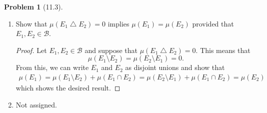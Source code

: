 \documentclass[12pt]{article}
\newcommand{\B}{\mathcal{B}}
\theoremstyle{definition}
\newtheorem{problem}{Problem}
\begin{document}
\begin{problem}[11.3]

    \begin{enumerate}[label = (\alph{*})]
        \item Show that \( \mu(E_1 \bigtriangleup E_2) = 0 \) implies \( \mu(E_1) = \mu(E_2) \) provided that \( E_1, E_2 \in \B  \). 
            \begin{proof}
                Let \( E_1, E_2 \in \B \) and suppose that \( \mu(E_1 \bigtriangleup E_2) = 0 \). This means that
                    \[
                        \mu(E_1 \setminus E_2) = \mu(E_2 \setminus E_1) = 0.
                    \]
                From this, we can write \( E_1 \) and \( E_2 \) as disjoint unions and show that 
                    \begin{align*}
                        \mu(E_1) = \mu(E_1 \setminus E_2) + \mu(E_1 \cap E_2) =  \mu(E_2 \setminus E_1) + \mu(E_1 \cap E_2) =  \mu(E_2)
                    \end{align*}
                which shows the desired result.
            \end{proof}
        \item Not assigned.
    \end{enumerate}


\end{problem}
\end{document}
